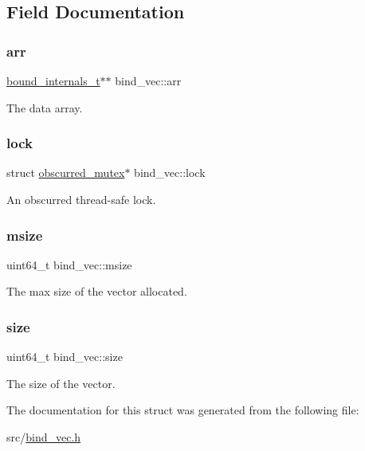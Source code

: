 \subsection{Field Documentation}
\mbox{\label{structbind__vec_a8bf39e88ad9a1715c7e6cfa4fa8028f4}} 
\subsubsection{\texorpdfstring{arr}{arr}}
{\footnotesize\ttfamily \hyperlink{structbound__internals__t}{bound\+\_\+internals\+\_\+t}$\ast$$\ast$ bind\+\_\+vec\+::arr}



The data array. 

\mbox{\label{structbind__vec_aed0bfcaa51d41aa82c371ab9aad863a6}} 
\subsubsection{\texorpdfstring{lock}{lock}}
{\footnotesize\ttfamily struct \hyperlink{structobscurred__mutex}{obscurred\+\_\+mutex}$\ast$ bind\+\_\+vec\+::lock}



An obscurred thread-\/safe lock. 

\mbox{\label{structbind__vec_aa45fa0f2e32261123f693541f26fc12b}} 
\subsubsection{\texorpdfstring{msize}{msize}}
{\footnotesize\ttfamily uint64\+\_\+t bind\+\_\+vec\+::msize}



The max size of the vector allocated. 

\mbox{\label{structbind__vec_a322fa9fd253719971508bf013a668a64}} 
\subsubsection{\texorpdfstring{size}{size}}
{\footnotesize\ttfamily uint64\+\_\+t bind\+\_\+vec\+::size}



The size of the vector. 



The documentation for this struct was generated from the following file\+:\begin{DoxyCompactItemize}
\item 
src/\hyperlink{bind__vec_8h}{bind\+\_\+vec.\+h}\end{DoxyCompactItemize}
